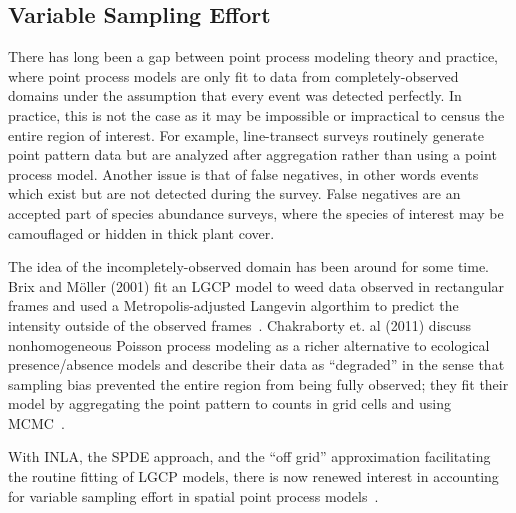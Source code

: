 \documentclass[]{interact}
\begin{document}


\subsection{Variable Sampling Effort}

There has long been a gap between point process modeling theory and practice,
where point process models are only fit to data from completely-observed
domains under the assumption that every event was detected perfectly. In
practice, this is not the case as it may be impossible or impractical to census
the entire region of interest. For example, line-transect surveys routinely
generate point pattern data but are analyzed after aggregation rather than
using a point process model. Another issue is that of false negatives, in other
words events which exist but are not detected during the survey. False
negatives are an accepted part of species abundance surveys, where the species
of interest may be camouflaged or hidden in thick plant cover.

The idea of the incompletely-observed domain has been around for some time.
Brix and M\"{o}ller (2001) fit an LGCP model to weed data observed in
rectangular frames and used a Metropolis-adjusted Langevin algorthim
to predict the intensity outside of the observed frames~\cite{brixmoeller}.
Chakraborty et. al (2011) discuss nonhomogeneous Poisson process modeling as
a richer alternative to ecological presence/absence models and describe their
data as ``degraded'' in the sense that sampling bias prevented the entire
region from being fully observed; they fit their model by aggregating the
point pattern to counts in grid cells and using MCMC~\cite{chakrabortyetal}.

With INLA, the SPDE approach, and the ``off grid'' approximation
facilitating the routine fitting of LGCP models, there is now renewed interest
in accounting for variable sampling effort in spatial point process
models~\cite{simpsonetal,yuanetal}.
\end{document}
